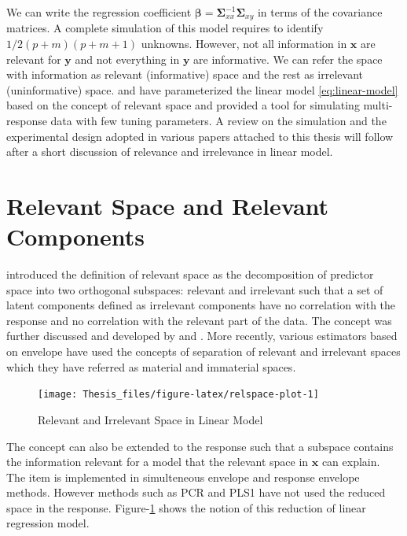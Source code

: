 \documentclass[11pt,twoside,openright,titlepage,
  headinclude,footinclude,BCOR=5mm,
  numbers=noenddot,cleardoublepage=empty,
  tablecaptionabove, dottedtoc,
  bibliography=totoc]{scrreprt}
\begin{document}
We can write the regression coefficient \(\boldsymbol{\beta} = \boldsymbol{\Sigma}_{xx}^{-1}\boldsymbol{\Sigma}_{xy}\) in terms of the covariance matrices. A complete simulation of this model requires to identify \(1/2(p+m)(p+m+1)\) unknowns. However, not all information in \(\mathbf{x}\) are relevant for \(\mathbf{y}\) and not everything in \(\mathbf{y}\) are informative. We can refer the space with information as relevant (informative) space and the rest as irrelevant (uninformative) space. \citet{saebo2015simrel} and \citet{Rimal2018} have parameterized the linear model \eqref{eq:linear-model} based on the concept of relevant space and provided a tool for simulating multi-response data with few tuning parameters. A review on the simulation and the experimental design adopted in various papers attached to this thesis will follow after a short discussion of relevance and irrelevance in linear model.

\hypertarget{relevant-space-and-relevant-components}{%
\section{Relevant Space and Relevant Components}\label{relevant-space-and-relevant-components}}

\citet{Naes1985} introduced the definition of relevant space as the decomposition of predictor space into two orthogonal subspaces: relevant and irrelevant such that a set of latent components defined as irrelevant components have no correlation with the response and no correlation with the relevant part of the data. The concept was further discussed and developed by \citet{helland1990partial} and \citet{naes1993relevant}. More recently, various estimators \citep{cook2010envelope, cook2013envelopes, cook2015simultaneous} based on envelope \citep{Cook2007a} have used the concepts of separation of relevant and irrelevant spaces which they have referred as material and immaterial spaces.

\begin{figure}[!htb]
\texttt{[image: Thesis\_files/figure-latex/relspace-plot-1]} \caption{Relevant and Irrelevant Space in Linear Model}\label{fig:relspace-plot}
\end{figure}

The concept can also be extended to the response such that a subspace contains the information relevant for a model that the relevant space in \(\mathbf{x}\) can explain. The item is implemented in simulteneous envelope \citep{cook2015simultaneous} and response envelope \citep{cook2010envelope} methods. However methods such as PCR and PLS1 have not used the reduced space in the response. Figure-\ref{fig:relspace-plot} shows the notion of this reduction of linear regression model.
\end{document}
